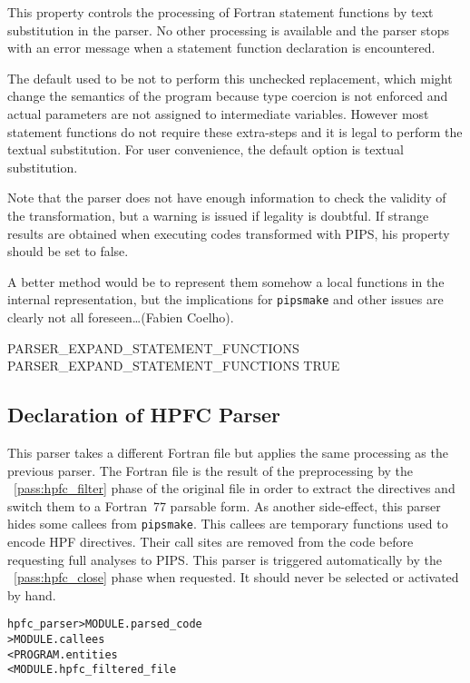 \documentclass[a4paper]{report}
\newenvironment{PipsMake}{\begin{alltt}}{\end{alltt}}
\newcommand{\PipsPassRef}[1]{\texttt{\detokenize{#1}}~\ref{pass:#1}}
\newenvironment{PipsPass}[1]{\label{pass:#1}}{}
\newcommand{\Pipsmake}{\texttt{pipsmake}}
\begin{document}
This property controls the processing of Fortran statement functions by text
substitution in the parser. No other processing is available and the
parser stops with an error message when a statement function declaration
is encountered.

The default used to be not to perform this unchecked replacement, which might
change the semantics of the program because type coercion is not enforced
and actual parameters are not assigned to intermediate variables.
However most statement functions do not require these extra-steps and it
is legal to perform the textual substitution. For user convenience, the
default option is textual substitution.

Note that the parser does not have enough information to check the validity
of the transformation, but a warning is issued if legality is doubtful. If
strange results are obtained when executing codes transformed with PIPS,
his property should be set to false.

A better method would be to represent them somehow a local functions in
the internal representation, but the implications for \Pipsmake{}
and other issues are clearly not all foreseen\ldots (Fabien Coelho).

\begin{PipsProp}{PARSER_EXPAND_STATEMENT_FUNCTIONS}
PARSER_EXPAND_STATEMENT_FUNCTIONS TRUE
\end{PipsProp}


\subsection{Declaration of HPFC Parser}

\begin{PipsPass}{hpfc_parser}
This parser takes a different Fortran file but applies the same
processing as the previous parser. The Fortran file is the result of the
preprocessing by the \PipsPassRef{hpfc_filter} phase of the original file in
order to extract the directives and switch them to a Fortran~77 parsable
form. As another side-effect, this parser hides some callees from
\Pipsmake{}. This callees are temporary functions used to encode HPF
directives. Their call sites are removed from the code before requesting full analyses
to PIPS. This parser is triggered automatically by the \PipsPassRef{hpfc_close}
phase when requested. It should never be selected or activated by hand.
\end{PipsPass}

\begin{PipsMake}
hpfc_parser                     > MODULE.parsed_code
                                > MODULE.callees
        < PROGRAM.entities
        < MODULE.hpfc_filtered_file
\end{PipsMake}
\end{document}
